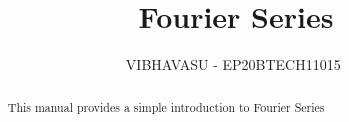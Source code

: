 \documentclass[journal,12pt,twocolumn]{IEEEtran}
\renewcommand\thesection{\arabic{section}}
\begin{document}
\let\StandardTheFigure\thefigure
\renewcommand{\thefigure}{\theproblem}



\def\putbox#1#2#3{\makebox[0in][l]{\makebox[#1][l]{}\raisebox{\baselineskip}[0in][0in]{\raisebox{#2}[0in][0in]{#3}}}}
     \def\rightbox#1{\makebox[0in][r]{#1}}
     \def\centbox#1{\makebox[0in]{#1}}
     \def\topbox#1{\raisebox{-\baselineskip}[0in][0in]{#1}}
     \def\midbox#1{\raisebox{-0.5\baselineskip}[0in][0in]{#1}}

\vspace{3cm}

\title{ 
Fourier Series
}


%
%
%

\author{ VIBHAVASU - EP20BTECH11015 $^{}$}

\maketitle


\tableofcontents


\renewcommand{\thefigure}{\theenumi}
\renewcommand{\thetable}{\theenumi}



\bigskip

\begin{abstract}
This manual provides a simple introduction to Fourier Series
\end{abstract}
\end{document}
